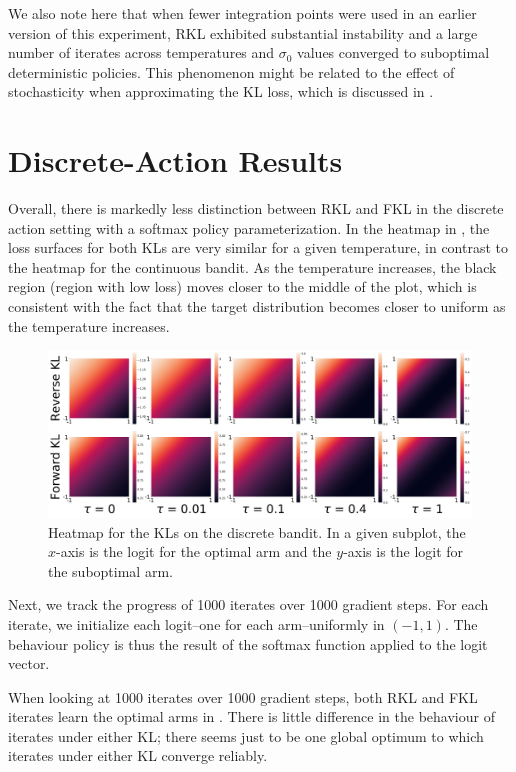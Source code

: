 \documentclass[\main/thesis.tex]{subfiles}
\begin{document}
We also note here that when fewer integration points were used in an earlier version of this experiment, RKL exhibited substantial instability and a large number of iterates across temperatures and $\sigma_0$ values converged to suboptimal deterministic policies. This phenomenon might be related to the effect of stochasticity when approximating the KL loss, which is discussed in .

 
\section{Discrete-Action Results}\label{sec:microworld-discrete-actions}

Overall, there is markedly less distinction between RKL and FKL in the discrete action setting with a softmax policy parameterization. In the heatmap in , the loss surfaces for both KLs are very similar for a given temperature, in contrast to the heatmap for the continuous bandit. As the temperature increases, the black region (region with low loss) moves closer to the middle of the plot, which is consistent with the fact that the target distribution becomes closer to uniform as the temperature increases. 
\begin{figure}[!htb]
    \centering
    \includegraphics[width=1\columnwidth]{figs/discrete-bandit/heatmaps/discrete.png}
    \caption{Heatmap for the KLs on the discrete bandit. In a given subplot, the $x$-axis is the logit for the optimal arm and the $y$-axis is the logit for the suboptimal arm.}
    \label{fig:discrete-heatmap}
  \end{figure}

Next, we track the progress of 1000 iterates over 1000 gradient steps. For each iterate, we initialize each logit--one for each arm--uniformly in $(-1, 1)$. The behaviour policy is thus the result of the softmax function applied to the logit vector. 

When looking at 1000 iterates over 1000 gradient steps, both RKL and FKL iterates learn the optimal arms in . There is little difference in the behaviour of iterates under either KL; there seems just to be one global optimum to which iterates under either KL converge reliably. 
\end{document}
